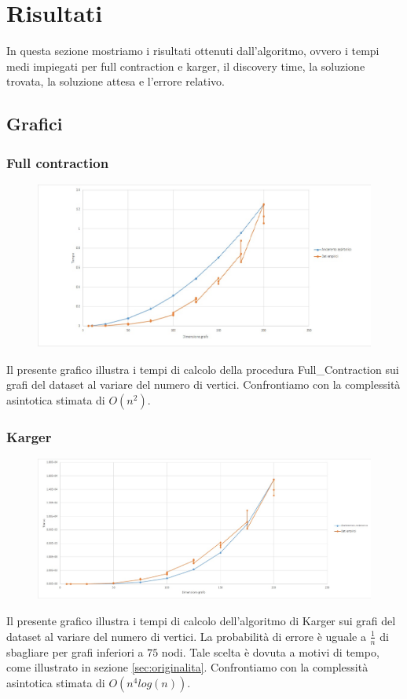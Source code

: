 \chapter{Risultati\label{sec:risultati}}
\noindent In questa sezione mostriamo i risultati ottenuti dall'algoritmo, ovvero i tempi medi impiegati per full contraction e karger, il discovery time, la soluzione trovata, la soluzione attesa e l'errore relativo.

\section{Grafici\label{sec:grafici}}

\subsection{Full contraction\label{sec:fc}}
\begin{figure}[htp]
    \centering
    \includegraphics[width=\textwidth]{immagini/full_contraction.jpg}
\end{figure}
Il presente grafico illustra i tempi di calcolo della procedura Full\_Contraction sui grafi del dataset al variare del numero di vertici. Confrontiamo con la complessità asintotica stimata di \(O(n^{2})\).

\subsection{Karger\label{sec:karger}}
\begin{figure}[htp]
    \centering
    \includegraphics[width=\textwidth]{immagini/karger.jpg}
\end{figure}
Il presente grafico illustra i tempi di calcolo dell'algoritmo di Karger sui grafi del dataset al variare del numero di vertici. La probabilità di errore è uguale a \(\frac{1}{n}\) di sbagliare per grafi inferiori a $75$ nodi. Tale scelta è dovuta a motivi di tempo, come illustrato in sezione \vref{sec:originalita}. Confrontiamo con la complessità asintotica stimata di \(O(n^{4}log(n))\).


